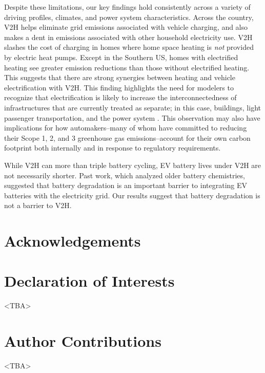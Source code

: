 \documentclass[11pt,preprint]{elsarticle}
\begin{document}
Despite these limitations, our key findings hold consistently across a variety of driving profiles, climates, and power system characteristics. Across the country, V2H helps eliminate grid emissions associated with vehicle charging, and also makes a dent in emissions associated with other household electricity use. V2H slashes the cost of charging in homes where home space heating is \textit{not} provided by electric heat pumps. Except in the Southern US, homes with electrified heating see greater emission reductions than those without electrified heating. This suggests that there are strong synergies between heating and vehicle electrification with V2H. This finding highlights the need for modelers to recognize that electrification is likely to increase the interconnectedness of infrastructures that are currently treated as separate; in this case, buildings, light passenger transportation, and the power system \cite{vaishnav_implications_2023}. This observation may also have implications for how automakers--many of whom have committed to reducing their Scope 1, 2, and 3 greenhouse gas emissions--account for their own carbon footprint both internally and in response to regulatory requirements. 

While V2H can more than triple battery cycling, EV battery lives under V2H are not necessarily shorter. Past work, which analyzed older battery chemistries, suggested that battery degradation is an important barrier to integrating EV batteries with the electricity grid. Our results suggest that battery degradation is not a barrier to V2H. 

\section*{Acknowledgements}



\section*{Declaration of Interests}
<TBA>

\section*{Author Contributions}
<TBA> 
\makeatletter
\renewcommand \thesection{S\@arabic\c@section}
\renewcommand\thetable{S\@arabic\c@table}
\renewcommand \thefigure{S\@arabic\c@figure}
\makeatother

\renewcommand{\citenumfont}[1]{S#1}
\end{document}
